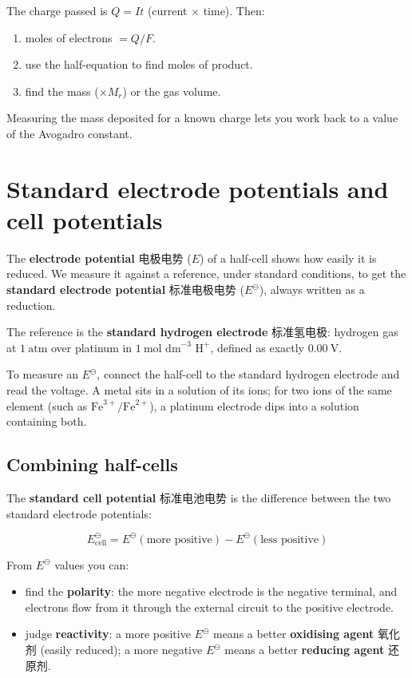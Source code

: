 \documentclass[11pt]{article}
\begin{document}
The charge passed is $Q = It$ (current $\times$ time). Then:

\begin{enumerate}
\item moles of electrons $= Q / F$.

\item use the half-equation to find moles of product.

\item find the mass ($\times M_r$) or the gas volume.

\end{enumerate}

Measuring the mass deposited for a known charge lets you work back to a value of the Avogadro constant.

\section*{Standard electrode potentials and cell potentials}

The \textbf{electrode potential} 电极电势 ($E$) of a half-cell shows how easily it is reduced. We measure it against a reference, under standard conditions, to get the \textbf{standard electrode potential} 标准电极电势 ($E^{\ominus}$), always written as a reduction.

The reference is the \textbf{standard hydrogen electrode} 标准氢电极: hydrogen gas at $1\ \text{atm}$ over platinum in $1\ \text{mol dm}^{-3}$ $\text{H}^+$, defined as exactly $0.00\ \text{V}$.

To measure an $E^{\ominus}$, connect the half-cell to the standard hydrogen electrode and read the voltage. A metal sits in a solution of its ions; for two ions of the same element (such as $\text{Fe}^{3+}/\text{Fe}^{2+}$), a platinum electrode dips into a solution containing both.

\subsection*{Combining half-cells}

The \textbf{standard cell potential} 标准电池电势 is the difference between the two standard electrode potentials:

\[
E^{\ominus}_{\text{cell}} = E^{\ominus}(\text{more positive}) - E^{\ominus}(\text{less positive})
\]

From $E^{\ominus}$ values you can:

\begin{itemize}
\item find the \textbf{polarity}: the more negative electrode is the negative terminal, and electrons flow from it through the external circuit to the positive electrode.

\item judge \textbf{reactivity}: a more positive $E^{\ominus}$ means a better \textbf{oxidising agent} 氧化剂 (easily reduced); a more negative $E^{\ominus}$ means a better \textbf{reducing agent} 还原剂.

\end{itemize}
\end{document}
